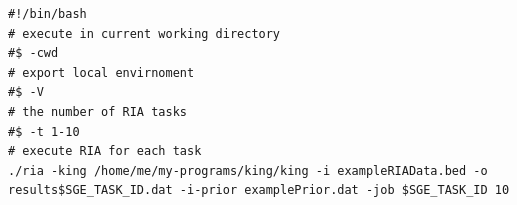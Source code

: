 \documentclass[a4paper,12pt]{article}
\begin{document}
\vspace{0.35cm} \begin{lstlisting}
#!/bin/bash
# execute in current working directory
#$ -cwd
# export local envirnoment
#$ -V
# the number of RIA tasks
#$ -t 1-10
# execute RIA for each task
./ria -king /home/me/my-programs/king/king -i exampleRIAData.bed -o results$SGE_TASK_ID.dat -i-prior examplePrior.dat -job $SGE_TASK_ID 10

\end{lstlisting} \vspace{0.35cm}





\end{document}

